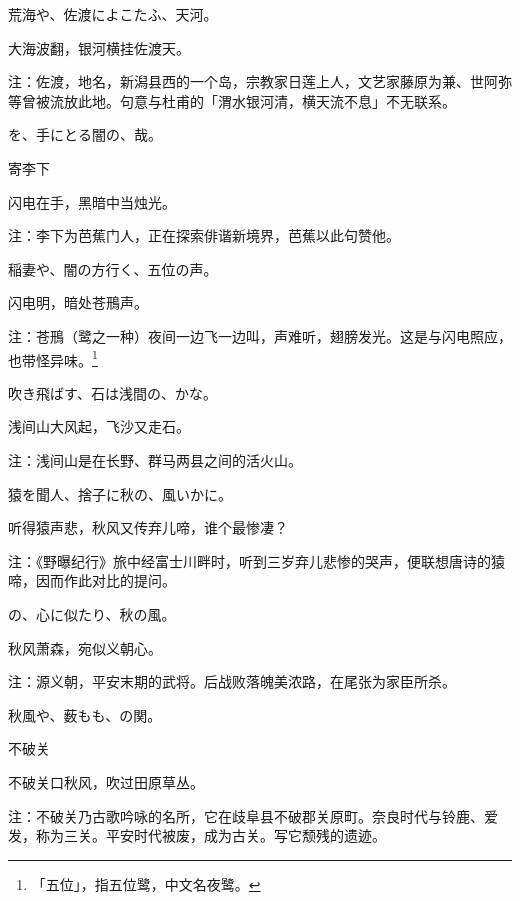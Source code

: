 \begin{haiku}
    {\FH 荒海や、佐渡によこたふ、天河。}

    {\FK 大海波翻，银河横挂佐渡天。}

    {\FT 注：佐渡，地名，新潟县西的一个岛，宗教家日莲上人，文艺家藤原为兼、世阿弥等曾被流放此地。句意与杜甫的「渭水银河清，横天流不息」不无联系。}
\end{haiku}

\begin{haiku}
    {\FH {}を、手にとる闇の、哉。}

    {\FK 寄李下}

    {\FK 闪电在手，黑暗中当烛光。}

    {\FT 注：李下为芭蕉门人，正在探索俳谐新境界，芭蕉以此句赞他。}
\end{haiku}

\begin{haiku}
    {\FH 稲妻や、闇の方行く、五位の声。}

    {\FK 闪电明，暗处苍鳽声。}

    {\FT 注：苍鳽（鹭之一种）夜间一边飞一边叫，声难听，翅膀发光。这是与闪电照应，也带怪异味。\footnote{\FT 「五位」，指五位鹭，中文名夜鹭。}}
\end{haiku}

\begin{haiku}
    {\FH 吹き飛ばす、石は浅間の、かな。}

    {\FK 浅间山大风起，飞沙又走石。}

    {\FT 注：浅间山是在长野、群马两县之间的活火山。}
\end{haiku}

\begin{haiku}
    {\FH 猿を聞人、捨子に秋の、風いかに。}

    {\FK 听得猿声悲，秋风又传弃儿啼，谁个最惨凄？}

    {\FT 注：《野曝纪行》旅中经富士川畔时，听到三岁弃儿悲惨的哭声，便联想唐诗的猿啼，因而作此对比的提问。}
\end{haiku}

\begin{haiku}
    {\FH {}の、心に似たり、秋の風。}

    {\FK 秋风萧森，宛似义朝心。}

    {\FT 注：源义朝，平安末期的武将。后战败落魄美浓路，在尾张为家臣所杀。}
\end{haiku}

\begin{haiku}
    {\FH 秋風や、薮もも、の関。}

    {\FK 不破关}

    {\FK 不破关口秋风，吹过田原草丛。}

    {\FT 注：不破关乃古歌吟咏的名所，它在歧阜县不破郡关原町。奈良时代与铃鹿、爱发，称为三关。平安时代被废，成为古关。写它颓残的遗迹。}
\end{haiku}

